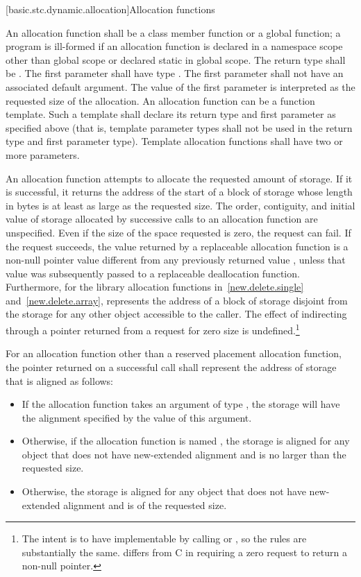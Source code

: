 [basic.stc.dynamic.allocation]{Allocation functions}

\pnum
{}%
An allocation function shall be a class member function or a global
function; a program is ill-formed if an allocation function is declared
in a namespace scope other than global scope or declared static in
global scope. The return type shall be . The first
parameter shall have type . The
first parameter shall not have an associated default
argument. The value of the first parameter
is interpreted as the requested size of the allocation. An allocation
function can be a function template. Such a template shall declare its
return type and first parameter as specified above (that is, template
parameter types shall not be used in the return type and first parameter
type). Template allocation functions shall have two or more parameters.

\pnum
An allocation function attempts to allocate the requested amount of
storage. If it is successful, it returns the address of the start
of a block of storage whose length in bytes is at least as large
as the requested size.
The order,
contiguity, and initial value of storage allocated by successive calls
to an allocation function are unspecified.
Even if the size of the space
requested is zero, the request can fail. If the request succeeds, the
value returned by a replaceable allocation function
is a non-null pointer value
 different from any previously returned value ,
unless that value  was subsequently passed to a
replaceable deallocation function.
Furthermore, for the library allocation functions
in~\ref{new.delete.single} and~\ref{new.delete.array},
 represents the address of a block of storage disjoint from the storage
for any other object accessible to the caller.
The effect of indirecting through a pointer
returned from a request for zero size is undefined.\footnote{The intent is
to have  implementable by
calling  or , so the rules are
substantially the same. \Cpp{} differs from C in requiring a zero request
to return a non-null pointer.}

\pnum
For an allocation function other than
a reserved placement allocation function,
the pointer returned on a successful call
shall represent the address of storage that is aligned as follows:
\begin{itemize}
\item
  If the allocation function takes an argument
  of type ,
  the storage will have the alignment specified
  by the value of this argument.
\item
  Otherwise, if the allocation function is named ,
  the storage is aligned for any object that
  does not have new-extended alignment and
  is no larger than the requested size.
\item
  Otherwise, the storage is aligned for any object that
  does not have new-extended alignment and is of the requested size.
\end{itemize}

